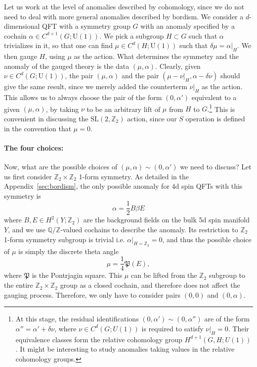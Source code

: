 \documentclass[12pt]{article}
\numberwithin{equation}{section}
\def\bQ{\mathbb{Q}}
\def\bZ{\mathbb{Z}}
\def\fP{\mathfrak{P}}
\def\U{\mathrm{U}}
\def\SL{\mathrm{SL}}
\begin{document}
Let us work at the level of anomalies described by cohomology, since we do not need to deal with more general anomalies described by bordism.
We consider a $d$-dimensional QFT with a symmetry group $G$ with an anomaly specified by a cochain $\alpha\in C^{d+1}(G;\U(1))$. 
We pick a subgroup $H\subset G$ such that $\alpha$ trivializes in it, so that one can find $\mu \in C^d(H;\U(1))$ such that $\delta \mu = \alpha|_H$. 
We then gauge $H$, using $\mu$ as the action.
What determines the symmetry and the anomaly of the gauged theory is the data $(\mu,\alpha)$.
Clearly, given $\nu\in C^d(G;\U(1))$, the pair $(\mu,\alpha)$ and the pair $(\mu-\nu|_H,\alpha-\delta\nu)$ should give the same result, since we merely added the counterterm $\nu|_H$ as the action.
This allows us to always choose the pair of the form $(0,\alpha')$ equivalent to a given $(\mu,\alpha)$, 
by taking $\nu$ to be an arbitrary lift of $\mu$ from $H$ to $G$.\footnote{%
At this stage, the residual identifications $(0,\alpha')\sim (0,\alpha'')$ are of the form 
$\alpha''=\alpha'+\delta \nu$, where $\nu\in C^{d}(G;U(1))$ is required to satisfy $\nu|_H=0$.
Their equivalence classes form the relative cohomology group $H^{d+1}(G,H;U(1))$.
It might be interesting to study anomalies taking values in the relative cohomology groups.
}
This is convenient in discussing the $\SL(2,\bZ_2)$ action,
since our $S$ operation is defined in the convention that $\mu=0$.

\paragraph{The four choices:}
Now, what are the possible choices of $(\mu,\alpha)\sim(0,\alpha')$ we need to discuss?
Let us first consider $\bZ_2\times \bZ_2$ 1-form symmetry.
As detailed in the Appendix~\ref{sec:bordism}, the only possible anomaly for 4d spin QFTs with this symmetry is \begin{equation}
\alpha=%
\frac12  B\beta E  \label{anom}
\end{equation} where $B,E\in H^2(Y;\bZ_2)$ are the background fields on the bulk 5d spin manifold $Y$,
and we use $\bQ/\bZ$-valued cochains to describe the anomaly.
Its restriction to $\bZ_2$ 1-form symmetry subgroup is trivial i.e. $\alpha|_{H=\bZ_2} = 0$,
and thus the possible choice of $\mu$ is simply the discrete theta angle \begin{equation}
\mu =%
 \frac14 \fP(E),\label{P}
\end{equation}
where $\fP$ is the Pontrjagin square.
This $\mu$ can be lifted from the $\bZ_2$ subgroup to the entire $\bZ_2\times \bZ_2$ group as a closed cochain, 
and therefore does not affect the gauging process.
Therefore, we only have to consider pairs $(0,0)$ and $(0,\alpha)$.
\end{document}
